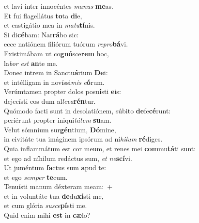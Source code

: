 \oddverse et lavi inter innocéntes \textit{ma}\textit{nus} \textbf{me}as.\\
\evenverse Et fui flagellátus \textbf{to}ta \textbf{di}e,~\*\\
\evenverse et castigátio mea in \textit{ma}\textit{tu}\textbf{tí}nis.\\
\oddverse Si di\textbf{cé}bam: Nar\textbf{rá}bo sic:~\*\\
\oddverse ecce natiónem filiórum tuórum \textit{re}\textit{pro}\textbf{bá}vi.\\
\evenverse Existimábam ut co\textbf{gnó}sce\textbf{rem} hoc,~\*\\
\evenverse la\textit{bor} \textit{est} \textbf{an}te me.\\
\oddverse Donec intrem in Sanctu\textbf{á}rium \textbf{De}i:~\*\\
\oddverse et intélligam in novíssi\textit{mis} \textit{e}\textbf{ó}rum.\\
\evenverse Verúmtamen propter dolos posu\textbf{í}sti \textbf{e}is:~\*\\
\evenverse dejecísti eos dum al\textit{le}\textit{va}\textbf{rén}tur.\\
\oddverse Quómodo facti sunt in desolatiónem, súbito \textbf{de}fe\textbf{cé}runt:~\*\\
\oddverse periérunt propter iniqui\textit{tá}\textit{tem} \textbf{su}am.\\
\evenverse Velut sómnium sur\textbf{gén}tium, \textbf{Dó}mine,~\*\\
\evenverse in civitáte tua imáginem ipsórum ad ní\textit{hi}\textit{lum} \textbf{ré}diges.\\
\oddverse Quia inflammátum est cor meum, et renes mei \textbf{com}mu\textbf{tá}ti sunt:~\*\\
\oddverse et ego ad níhilum redáctus sum, \textit{et} \textit{ne}\textbf{scí}vi.\\
\evenverse Ut juméntum \textbf{fa}ctus sum \textbf{a}pud te:~\*\\
\evenverse et ego \textit{sem}\textit{per} \textbf{te}cum.\\
\oddverse Tenuísti manum déxteram meam:~+\\
\oddverse  et in voluntáte tua \textbf{de}du\textbf{xí}sti me,~\*\\
\oddverse et cum glória \textit{su}\textit{sce}\textbf{pí}sti me.\\
\evenverse Quid enim mihi \textbf{est} in \textbf{cæ}lo?~\*\\
